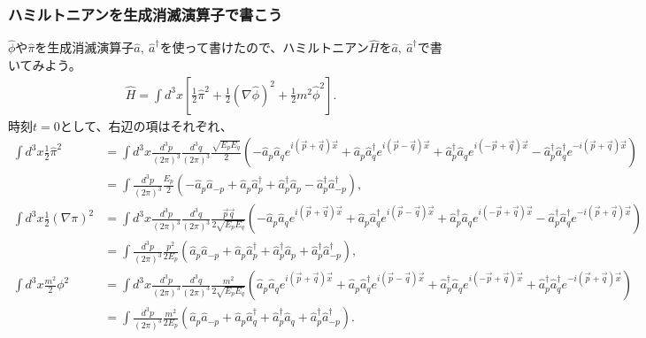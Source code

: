 \documentclass[10pt,a4paper]{jarticle}
\begin{document}
\subsubsection{ハミルトニアンを生成消滅演算子で書こう}
$\hat\phi$や$\hat\pi$を生成消滅演算子$\hat a,~\hat a^\dagger$を使って書けたので、ハミルトニアン$\hat H$を$\hat a,~\hat a^\dagger$で書いてみよう。
\begin{align}
\hat H
= \int d^3x \left[ \frac{1}{2} \hat\pi^2 + \frac{1}{2}(\nabla\hat\phi)^2 + \frac{1}{2} m^2 \hat\phi^2 \right].
\end{align}
%
時刻$t=0$として、右辺の項はそれぞれ、
\begin{align}
\int d^3x \frac{1}{2}\hat \pi^2
&=
\int d^3 x \frac{d^3 p}{(2\pi)^3} \frac{d^3 q}{(2\pi)^3} \frac{ \sqrt{E_p E_q} }{2}\left(
	 -\hat a_p \hat a_q e^{i(\vec p + \vec q)\vec x}
	 +\hat a_p \hat a_q^\dagger  e^{i(\vec p - \vec q)\vec x}
 	 +\hat a_p^\dagger \hat a_q  e^{i(-\vec p + \vec q)\vec x}
 	 -\hat a_p^\dagger \hat a_q^\dagger e^{-i(\vec p + \vec q)\vec x}
	 \right) \nonumber\\
&=
\int \frac{d^3 p}{(2\pi)^3} \frac{E_p}{2}\left(
	 -\hat a_p \hat a_{-p}
	 +\hat a_p \hat a_p^\dagger
 	 +\hat a_p^\dagger \hat a_p
 	 -\hat a_p^\dagger \hat a_{-p}^\dagger
	 \right), \\
%
\int d^3x \frac{1}{2} (\nabla\pi)^2
&=
\int d^3 x \frac{d^3 p}{(2\pi)^3} \frac{d^3 q}{(2\pi)^3} \frac{\vec p \vec q}{2\sqrt{E_p E_q}}\left(
	 -\hat a_p \hat a_q e^{i(\vec p + \vec q)\vec x}
	 +\hat a_p \hat a_q^\dagger  e^{i(\vec p - \vec q)\vec x}
 	 +\hat a_p^\dagger \hat a_q  e^{i(-\vec p + \vec q)\vec x}
 	 -\hat a_p^\dagger \hat a_q^\dagger e^{-i(\vec p + \vec q)\vec x}
	 \right) \nonumber\\
&=
\int \frac{d^3 p}{(2\pi)^3} \frac{p^2}{2E_p}\left(
	 \hat a_p \hat a_{-p}
	 +\hat a_p \hat a_p^\dagger
 	 +\hat a_p^\dagger \hat a_p
 	 +\hat a_p^\dagger \hat a_{-p}^\dagger
	 \right), \\
%
\int d^3x \frac{m^2}{2}\phi^2
&=
\int d^3 x \frac{d^3 p}{(2\pi)^3} \frac{d^3 q}{(2\pi)^3} \frac{m^2}{2\sqrt{E_p E_q} }\left(
	 \hat a_p \hat a_q e^{i(\vec p + \vec q)\vec x}
	 +\hat a_p \hat a_q^\dagger  e^{i(\vec p - \vec q)\vec x}
 	 +\hat a_p^\dagger \hat a_q  e^{i(-\vec p + \vec q)\vec x}
 	 +\hat a_p^\dagger \hat a_q^\dagger e^{-i(\vec p + \vec q)\vec x}
	 \right) \nonumber\\
&=
\int \frac{d^3 p}{(2\pi)^3} \frac{m^2}{2E_p}\left(
	 \hat a_p \hat a_{-p}
	 +\hat a_p \hat a_q^\dagger
 	 +\hat a_p^\dagger \hat a_q
 	 +\hat a_p^\dagger \hat a_{-p}^\dagger
	 \right).
\end{align}
\end{document}
